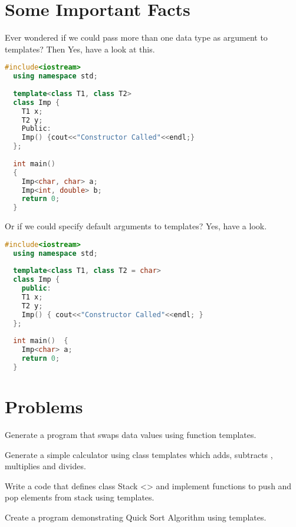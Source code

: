 \documentclass[11pt,fleqn]{book} %
\begin{document}
\section{Some Important Facts}

Ever wondered if we could pass more than one data type as argument to templates? Then Yes, have a look at this.

\begin{lstlisting}[language=C++, caption= Important Fact 1]
  #include<iostream>
  using namespace std;
  
  template<class T1, class T2>
  class Imp {
    T1 x;
    T2 y;
    Public:
    Imp() {cout<<"Constructor Called"<<endl;}
  };
  
  int main()  
  {
    Imp<char, char> a;
    Imp<int, double> b;
    return 0;
  }
\end{lstlisting}

Or if we could specify default arguments to templates? Yes, have a look.
\begin{lstlisting}[language=C++, caption= Important Fact 2]
  #include<iostream>
  using namespace std;
  
  template<class T1, class T2 = char>
  class Imp {
    public:
    T1 x;
    T2 y;
    Imp() { cout<<"Constructor Called"<<endl; }
  };
  
  int main()  {
    Imp<char> a; 
    return 0;
  }
\end{lstlisting}

\section{Problems}

\begin{problem} Generate a program that swaps data values using function templates.\\
\end{problem}
\begin{problem} Generate a simple calculator using class templates which adds, subtracts , multiplies and divides.\\
\end{problem}
\begin{problem} Write a code that defines class Stack <> and implement functions to push and pop elements from stack using templates.\\
\end{problem}
\begin{problem} Create a program demonstrating Quick Sort Algorithm using templates.
\end{problem}
\end{document}
